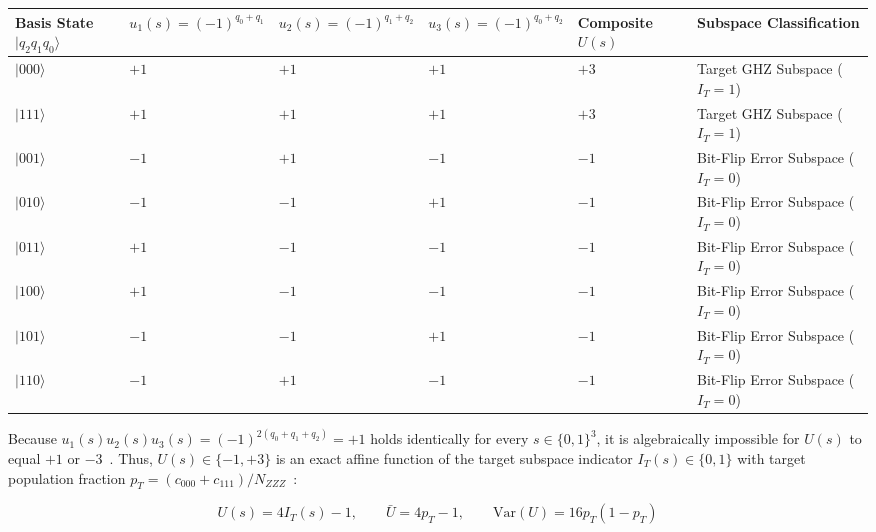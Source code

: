 \documentclass[10pt,letterpaper]{article}
\begin{document}
\vspace{6pt}\noindent\begin{minipage}{\textwidth}
\centering
{}
\vspace{2pt}
\footnotesize
\begin{tabularx}{\textwidth}{C{2.4cm} R{2.2cm} R{2.2cm} R{2.2cm} R{2.6cm} Y}
\toprule
\textbf{Basis State $\vert q_2 q_1 q_0 \rangle$} & \textbf{$u_1(s)=(-1)^{q_0+q_1}$} & \textbf{$u_2(s)=(-1)^{q_1+q_2}$} & \textbf{$u_3(s)=(-1)^{q_0+q_2}$} & \textbf{Composite $U(s)$} & \textbf{Subspace Classification} \\
\midrule
$\vert 000 \rangle$ & $+1$ & $+1$ & $+1$ & $+3$ & Target GHZ Subspace ($I_T = 1$) \\
$\vert 111 \rangle$ & $+1$ & $+1$ & $+1$ & $+3$ & Target GHZ Subspace ($I_T = 1$) \\
$\vert 001 \rangle$ & $-1$ & $+1$ & $-1$ & $-1$ & Bit-Flip Error Subspace ($I_T = 0$) \\
$\vert 010 \rangle$ & $-1$ & $-1$ & $+1$ & $-1$ & Bit-Flip Error Subspace ($I_T = 0$) \\
$\vert 011 \rangle$ & $+1$ & $-1$ & $-1$ & $-1$ & Bit-Flip Error Subspace ($I_T = 0$) \\
$\vert 100 \rangle$ & $+1$ & $-1$ & $-1$ & $-1$ & Bit-Flip Error Subspace ($I_T = 0$) \\
$\vert 101 \rangle$ & $-1$ & $-1$ & $+1$ & $-1$ & Bit-Flip Error Subspace ($I_T = 0$) \\
$\vert 110 \rangle$ & $-1$ & $+1$ & $-1$ & $-1$ & Bit-Flip Error Subspace ($I_T = 0$) \\
\bottomrule
\end{tabularx}
\end{minipage}\vspace{6pt}

Because $u_1(s) u_2(s) u_3(s) = (-1)^{2(q_0 + q_1 + q_2)} = +1$ holds identically for every $s \in \{0,1\}^3$, it is algebraically impossible for $U(s)$ to equal $+1$ or $-3$~\cite{qfx_doc}. Thus, $U(s) \in \{-1, +3\}$ is an exact affine function of the target subspace indicator $I_T(s) \in \{0, 1\}$ with target population fraction $p_T = (c_{000} + c_{111}) / N_{ZZZ}$~\cite{qfx_doc}:

\begin{equation}
U(s) = 4 I_T(s) - 1, \qquad \bar{U} = 4 p_T - 1, \qquad \mathrm{Var}(U) = 16 p_T (1 - p_T)
\end{equation}
\end{document}
